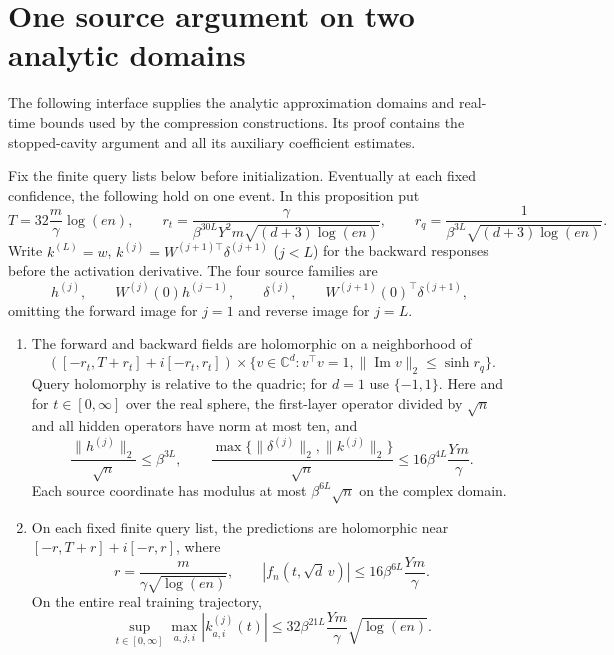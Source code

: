 \section{One source argument on two analytic domains}
\label{cp:foundations}

The following interface supplies the analytic approximation domains and
real-time bounds used by the compression constructions.  Its proof contains
the stopped-cavity argument and all its auxiliary coefficient estimates.

\begin{proposition}
\label{cp:source}
Fix the finite query lists below before initialization. Eventually at each
fixed confidence, the following hold on one event. In this proposition put
\[
 T=32\frac m\gamma\log(en),\qquad
 r_t=\frac{\gamma}{\beta^{30L}Y^2m\sqrt{(d+3)\log(en)}},\qquad
 r_q=\frac1{\beta^{3L}\sqrt{(d+3)\log(en)}}.
\]
Write \(k^{(L)}=w\), \(k^{(j)}=W^{(j+1)\top}\delta^{(j+1)}\) (\(j<L\)) for
the backward responses before the activation derivative. The four source
families are
\begin{equation}
 h^{(j)},\qquad W^{(j)}(0)h^{(j-1)},\qquad
 \delta^{(j)},\qquad W^{(j+1)}(0)^\top\delta^{(j+1)},
 \label{cp:source-families}
\end{equation}
omitting the forward image for \(j=1\) and reverse image for \(j=L\).

\begin{enumerate}[label=(\roman*)]
\item The forward and backward fields are holomorphic on a neighborhood of
\[
 ([-r_t,T+r_t]+i[-r_t,r_t])\times
 \{v\in\mathbb C^d:v^\top v=1,
                      \|\operatorname{Im}v\|_2\le\sinh r_q\}.
\]
Query holomorphy is relative to the quadric; for \(d=1\) use \(\{-1,1\}\).
Here and for \(t\in[0,\infty]\) over the real sphere, the first-layer
operator divided by \(\sqrt n\) and all hidden operators have norm at most
ten, and
\begin{equation}
 \frac{\|h^{(j)}\|_2}{\sqrt n}\le\beta^{3L},\qquad
 \frac{\max\{\|\delta^{(j)}\|_2,\|k^{(j)}\|_2\}}{\sqrt n}
 \le16\beta^{4L}\frac{Ym}{\gamma}.
 \label{cp:source-rms}
\end{equation}
Each source coordinate has modulus at most \(\beta^{6L}\sqrt n\)
on the complex domain.

\item On each fixed finite query list, the predictions are holomorphic near
\([-r,T+r]+i[-r,r]\), where
\begin{equation}
 r=\frac m{\gamma\sqrt{\log(en)}},\qquad
 |f_n(t,\sqrt d\,v)|\le16\beta^{6L}\frac{Ym}{\gamma}.
 \label{cp:finite-time}
\end{equation}
On the entire real training trajectory,
\begin{equation}
 \sup_{t\in[0,\infty]}\max_{a,j,i}|k_{a,i}^{(j)}(t)|
 \le32\beta^{21L}\frac{Ym}{\gamma}\sqrt{\log(en)}.
 \label{cp:carrier}
\end{equation}


\end{enumerate}
\end{proposition}
